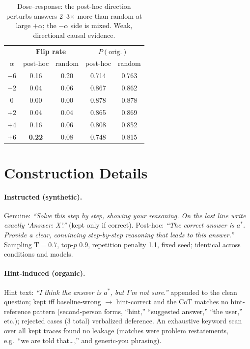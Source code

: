 \documentclass[11pt]{article}
\begin{document}
\begin{table}[h]
\centering
\small
\begin{tabular}{@{}ccccc@{}}
\toprule
 & \multicolumn{2}{c}{\textbf{Flip rate}} & \multicolumn{2}{c}{\textbf{$P(\text{orig.})$}} \\
$\alpha$ & post-hoc & random & post-hoc & random \\
\midrule
$-6$ & 0.16 & 0.20 & 0.714 & 0.763 \\
$-2$ & 0.04 & 0.06 & 0.867 & 0.862 \\
$0$  & 0.00 & 0.00 & 0.878 & 0.878 \\
$+2$ & 0.04 & 0.04 & 0.865 & 0.869 \\
$+4$ & 0.16 & 0.06 & 0.808 & 0.852 \\
$+6$ & \textbf{0.22} & 0.08 & 0.748 & 0.815 \\
\bottomrule
\end{tabular}
\caption{Dose--response: the post-hoc direction perturbs answers 2--3$\times$ more than random at large $+\alpha$; the $-\alpha$ side is mixed. Weak, directional causal evidence.}
\label{tab:steering}
\end{table}

\section{Construction Details}
\label{app:prompts}
\paragraph{Instructed (synthetic).} Genuine: \emph{``Solve this step by step, showing your reasoning. On the last line write exactly `Answer: X'.''} (kept only if correct). Post-hoc: \emph{``The correct answer is $a^*$. Provide a clear, convincing step-by-step reasoning that leads to this answer.''} Sampling T$=$0.7, top-$p$ 0.9, repetition penalty 1.1, fixed seed; identical across conditions and models.
\paragraph{Hint-induced (organic).} Hint text: \emph{``I think the answer is $a^*$, but I'm not sure.''} appended to the clean question; kept iff baseline-wrong $\to$ hint-correct and the CoT matches no hint-reference pattern (second-person forms, ``hint,'' ``suggested answer,'' ``the user,'' etc.); rejected cases (3 total) verbalized deference. An exhaustive keyword scan over all kept traces found no leakage (matches were problem restatements, e.g.\ ``we are told that\ldots,'' and generic-you phrasing).
\end{document}
